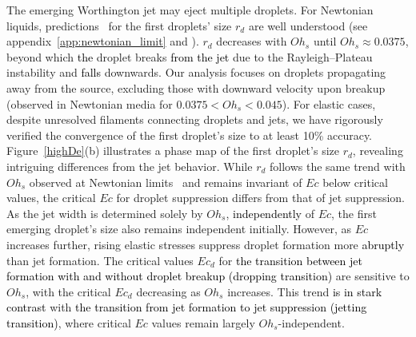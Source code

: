 \documentclass{jfm}
\newcommand{\DL}[1]{{\textcolor{black}{#1}}}
\newcommand{\VS}[1]{{\textcolor{black}{#1}}}
\newcommand{\AO}[1]{{\textcolor{black}{#1}}}
\newcommand{\KZ}[1]{{\textcolor{black}{#1}}}
\newcommand{\AKD}[1]{{\textcolor{black}{#1}}}
\newcommand{\oo}{\color{black} \normalfont}
\newcommand{\bb}{\color{black} \normalfont}
\begin{document}
The emerging Worthington jet may eject multiple droplets. For Newtonian liquids, \oo predictions\bb\, for the first droplets' size $r_d$ are well understood (see appendix~\ref{app:newtonian_limit} and \cite{ganan2017revision,blanco2020sea}). $r_d$ decreases with $Oh_s$ until $Oh_s \approx 0.0375$, beyond which \DL{the} droplet breaks \DL{from the jet} due to the Rayleigh--Plateau instability and \AKD{falls} downwards. Our analysis focuses on droplets propagating away from the source, excluding those with downward velocity upon breakup (observed in Newtonian media for $0.0375 < Oh_s < 0.045$). For elastic cases, despite unresolved filaments connecting droplets and jets, we have rigorously verified the convergence of the first droplet's size to at least 10\% accuracy.
Figure~\ref{highDe}(b) illustrates a phase map of the first droplet's size $r_d$, revealing intriguing differences from the jet behavior. While $r_d$ follows the same trend with $Oh_s$ \oo observed at Newtonian limits\bb\, and remains invariant of $Ec$ below critical values, the critical $Ec$ for droplet suppression differs from that of jet suppression. As the jet width is determined solely by $Oh_s$, \KZ{independently} of $Ec$, the first emerging droplet's size also remains independent initially. However, as $Ec$ increases further, rising elastic stresses suppress droplet formation more \AO{abruptly} than jet formation.
The critical values $Ec_d$ for \VS{the transition between jet formation with and without droplet breakup (dropping transition)} are sensitive to $Oh_s$, with the critical $Ec_d$ decreasing as $Oh_s$ increases. This trend \AO{is in stark contrast} with \VS{the transition from jet formation to jet suppression (jetting transition)}, where critical $Ec$ values remain largely $Oh_s$-independent.
\end{document}
